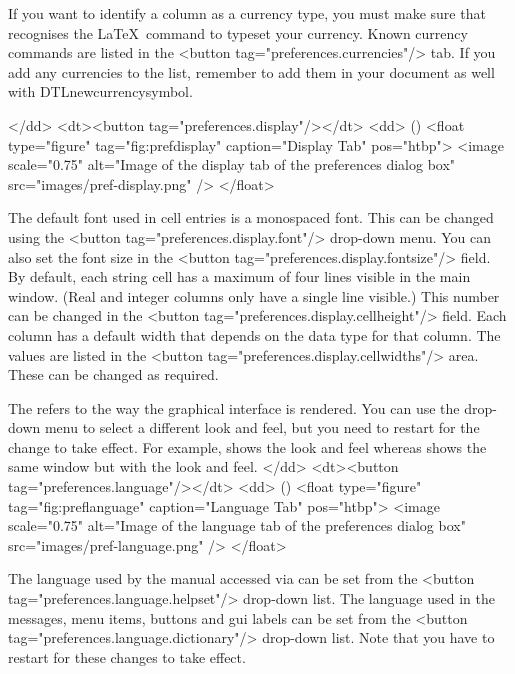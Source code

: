     If you want to identify a column as a currency type, you 
    must make sure that  recognises the \LaTeX\ command to typeset
    your currency. Known currency commands are listed in the 
    <button tag="preferences.currencies"/> tab. If you add any currencies
    to the list, remember to add them in your document as well with 
    \gls{DTLnewcurrencysymbol}.

    </dd>
    <dt><button tag="preferences.display"/></dt>
    <dd>
     ()
     <float type="figure" tag="fig:prefdisplay" caption="Display Tab" pos="htbp">
      <image scale="0.75" alt="Image of the display tab of the preferences dialog box" src="images/pref-display.png" />
     </float>

    The default font used in cell entries is a monospaced font. This can be
    changed using the <button tag="preferences.display.font"/> drop-down menu.
    You can also set the font size in the 
    <button tag="preferences.display.fontsize"/> field. By default, each
    string cell has a maximum of four lines visible in the main window.
    (Real and integer columns only have a single line visible.) This
    number can be changed in the <button tag="preferences.display.cellheight"/>
    field. Each column has a default width that depends on the data type
    for that column. The values are listed in the 
    <button tag="preferences.display.cellwidths"/> area. These can be changed
    as required.

The  refers to the way the graphical interface
    is rendered. You can use the drop-down menu to
    select a different look and feel, but you need to restart  
    for the change to take effect. For example, 
    shows the  look and feel whereas
    shows the same window but with the  look and feel.
    </dd>
    <dt><button tag="preferences.language"/></dt>
    <dd>
     ()
     <float type="figure" tag="fig:preflanguage" caption="Language Tab" pos="htbp">
      <image scale="0.75" alt="Image of the language tab of the preferences dialog box" src="images/pref-language.png" />
     </float>

    The language used by the manual accessed via 
    can be set from the <button tag="preferences.language.helpset"/> drop-down 
    list. The language used in the messages, menu items, buttons and 
    \gls{gui} labels can be set from the 
    <button tag="preferences.language.dictionary"/> drop-down 
    list. Note that you have to restart  for these changes to take 
    effect.

